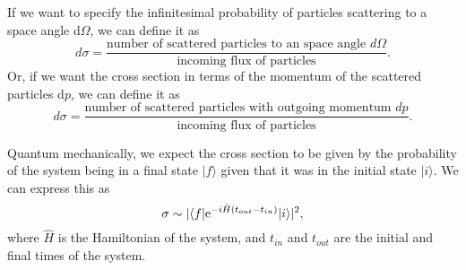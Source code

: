 If we want to specify the infinitesimal probability of particles scattering to a space angle d$\Omega$, we can define it as
\begin{equation}
    \label{eq:diff_cross_sec}
    d\sigma = \frac{\text{number of scattered particles to an space angle } d\Omega}{\text{incoming flux of particles}}.
\end{equation}
Or, if we want the cross section in terms of the momentum of the scattered particles d$p$, we can define it as 
\begin{equation}
    \label{eq:diff_cross_sec_p}
    d\sigma = \frac{\text{number of scattered particles with outgoing momentum } dp}{\text{incoming flux of particles}}.
\end{equation}

Quantum mechanically, we expect the cross section to be given by the probability of the system being in a final state $|f\rangle$ given that it was in the initial state $|i\rangle$.
We can express this as 
\begin{equation}
    \label{eq:cross_sec_qm}
    \sigma \sim |\langle f | \mathrm{e}^{-i \hat{H} (t_{out} - t_{in})} | i \rangle |^2,
\end{equation}
where $\hat{H}$ is the Hamiltonian of the system, and $t_{in}$ and $t_{out}$ are the initial and final times of the system.

